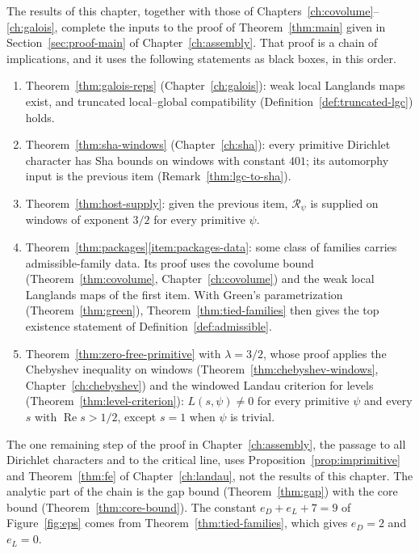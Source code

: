 \documentclass[11pt]{amsbook}
\theoremstyle{plain}
\theoremstyle{definition}
\theoremstyle{remark}
\numberwithin{equation}{section}
\numberwithin{figure}{chapter}
\numberwithin{table}{chapter}
\begin{document}
The results of this chapter, together with those of
Chapters~\ref{ch:covolume}--\ref{ch:galois}, complete the inputs to
the proof of Theorem~\ref{thm:main} given in
Section~\ref{sec:proof-main} of Chapter~\ref{ch:assembly}. That proof
is a chain of implications, and it uses the following statements as
black boxes, in this order.
\begin{enumerate}[label=(\arabic*)]
\item Theorem~\ref{thm:galois-reps} (Chapter~\ref{ch:galois}): weak
local Langlands maps exist, and truncated local--global compatibility
(Definition~\ref{def:truncated-lgc}) holds.
\item Theorem~\ref{thm:sha-windows} (Chapter~\ref{ch:sha}): every
primitive Dirichlet character has Sha bounds on windows with constant
$401$; its automorphy input is the previous item
(Remark~\ref{thm:lgc-to-sha}).
\item Theorem~\ref{thm:host-supply}: given the previous item,
$\mathscr R_\psi$ is supplied on windows of exponent $3/2$ for every
primitive $\psi$.
\item Theorem~\ref{thm:packages}\ref{item:packages-data}: some class
of families carries admissible-family data. Its proof uses the
covolume bound (Theorem~\ref{thm:covolume}, Chapter~\ref{ch:covolume})
and the weak local Langlands maps of the first item.
With Green's parametrization (Theorem~\ref{thm:green}),
Theorem~\ref{thm:tied-families} then gives the top existence
statement of Definition~\ref{def:admissible}.
\item Theorem~\ref{thm:zero-free-primitive} with $\lambda=3/2$, whose
proof applies the Chebyshev inequality on windows
(Theorem~\ref{thm:chebyshev-windows}, Chapter~\ref{ch:chebyshev}) and
the windowed Landau criterion for levels
(Theorem~\ref{thm:level-criterion}): $L(s,\psi)\ne0$ for every
primitive $\psi$ and every $s$ with $\operatorname{Re}s>1/2$, except
$s=1$ when $\psi$ is trivial.
\end{enumerate}
The one remaining step of the proof in Chapter~\ref{ch:assembly}, the
passage to all Dirichlet characters and to the critical line, uses
Proposition~\ref{prop:imprimitive} and Theorem~\ref{thm:fe} of
Chapter~\ref{ch:landau}, not the results of this chapter. The
analytic part of the chain is the gap bound (Theorem~\ref{thm:gap})
with the core bound (Theorem~\ref{thm:core-bound}). The constant
$e_D+e_L+7=9$ of Figure~\ref{fig:eps} comes from
Theorem~\ref{thm:tied-families}, which gives $e_D=2$ and $e_L=0$.
\clearpage

\appendix
\clearpage
\end{document}
